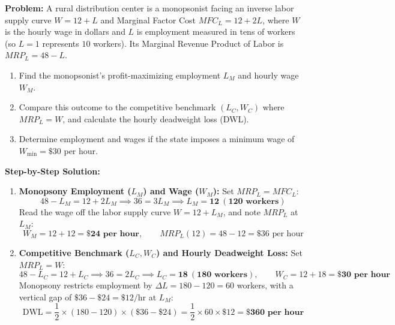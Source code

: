 \documentclass[11pt,letterpaper]{article}
\begin{document}
\begin{tcolorbox}[colback=CourseBlue!5!white,colframe=CourseBlue!80!black,title=\textbf{Work It Out: Monopsony Hiring, Deadweight Loss, and a Minimum Wage Floor}]
\textbf{Problem:} A rural distribution center is a monopsonist facing an inverse labor supply curve $W = 12 + L$ and Marginal Factor Cost $MFC_L = 12 + 2L$, where $W$ is the hourly wage in dollars and $L$ is employment measured in tens of workers (so $L = 1$ represents $10$ workers). Its Marginal Revenue Product of Labor is $MRP_L = 48 - L$.
\begin{enumerate}
    \item Find the monopsonist's profit-maximizing employment $L_M$ and hourly wage $W_M$.
    \item Compare this outcome to the competitive benchmark $(L_C, W_C)$ where $MRP_L = W$, and calculate the hourly deadweight loss (DWL).
    \item Determine employment and wages if the state imposes a minimum wage of $W_{\min} = \$30$ per hour.
\end{enumerate}

\medskip
\noindent\textbf{Step-by-Step Solution:}
\begin{enumerate}
    \item \textbf{Monopsony Employment ($L_M$) and Wage ($W_M$):}
    Set $MRP_L = MFC_L$:
    \[
    48 - L_M = 12 + 2L_M \implies 36 = 3L_M \implies L_M = \mathbf{12\ (120\text{ workers})}
    \]
    Read the wage off the labor supply curve $W = 12 + L_M$, and note $MRP_L$ at $L_M$:
    \[
    W_M = 12 + 12 = \mathbf{\$24\text{ per hour}}, \qquad MRP_L(12) = 48 - 12 = \$36\text{ per hour}
    \]

    \item \textbf{Competitive Benchmark ($L_C, W_C$) and Hourly Deadweight Loss:}
    Set $MRP_L = W$:
    \[
    48 - L_C = 12 + L_C \implies 36 = 2L_C \implies L_C = \mathbf{18\ (180\text{ workers})}, \qquad W_C = 12 + 18 = \mathbf{\$30\text{ per hour}}
    \]
    Monopsony restricts employment by $\Delta L = 180 - 120 = 60$ workers, with a vertical gap of $\$36 - \$24 = \$12/\text{hr}$ at $L_M$:
    \[
    \text{DWL} = \frac{1}{2} \times (180 - 120) \times (\$36 - \$24) = \frac{1}{2} \times 60 \times \$12 = \mathbf{\$360\text{ per hour}}
    \]


\end{enumerate}
\end{tcolorbox}
\end{document}

